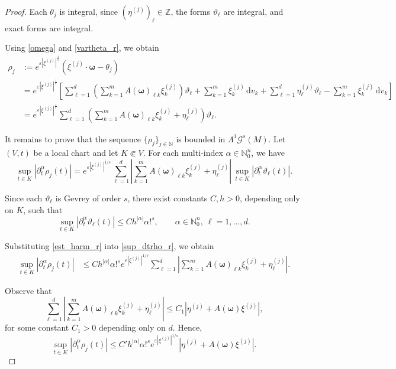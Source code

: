 \documentclass[11pt,reqno]{amsart}
\numberwithin{equation}{section}
\begin{document}
\begin{proof}
	Each $\theta_j$ is integral, since $(\eta^{(j)})_\ell\in\mathbb{Z}$, 
	the forms $\vartheta_\ell$ are integral, and exact forms are integral.
	
	Using \eqref{omega} and \eqref{vartheta_r}, we obtain
	\begin{align*}
		\rho_j & := e^{\varepsilon|\xi^{(j)}|^{\frac{1}{s}}}(\xi^{(j)} \cdot \boldsymbol{\omega} - \theta_j)\\
		& = e^{\varepsilon|\xi^{(j)}|^{\frac{1}{s}}}\left[\sum_{\ell=1}^{d}\left(\sum_{k=1}^{m}A(\boldsymbol{\omega})_{\ell k}\xi^{(j)}_k\right)\vartheta_\ell + \sum_{k=1}^{m}\xi^{(j)}_k\,\mathrm{d}v_k + \sum_{\ell=1}^{d}\eta^{(j)}_\ell\vartheta_\ell - \sum_{k=1}^{m}\xi^{(j)}_k\,\mathrm{d}v_k\right]\\
		& = e^{\varepsilon|\xi^{(j)}|^{\frac{1}{s}}} \sum_{\ell=1}^{d} \left(\sum_{k=1}^{m} A(\boldsymbol{\omega})_{\ell k}\xi^{(j)}_k + \eta^{(j)}_\ell\right)\vartheta_\ell.
	\end{align*}
	
	
	It remains to prove that the sequence $\{\rho_j\}_{j\in\mathbb{N}}$ is bounded in 	$\mathsf{\Lambda}^1 \mathscr{G}^s(M)$. Let $(V,t)$ be a local chart and let $K\Subset V$.  For each multi-index $\alpha\in\mathbb{N}_0^n$, we have 
	\begin{equation}\label{sup_dtrho_r}
		\sup_{t\in K} |\partial_t^\alpha \rho_j(t)| 
		= e^{\varepsilon|\xi^{(j)}|^{1/s}} \sum_{\ell=1}^d 	\left| \sum_{k=1}^m
		A(\boldsymbol{\omega})_{\ell k}\xi^{(j)}_k + \eta^{(j)}_\ell \right|
		\, 	\sup_{t\in K} |\partial_t^\alpha \vartheta_\ell(t)|.
	\end{equation}
	
	Since each $\vartheta_\ell$ is Gevrey of order $s$, 
	there exist constants $C,h>0$, depending only on $K$, such that
	\begin{equation}\label{est_harm_r}
		\sup_{t\in K}	|\partial_t^\alpha \vartheta_\ell(t)|
		\le C h^{|\alpha|}\alpha!^s, \qquad \alpha\in\mathbb{N}_0^n,\ \ell=1,\dots,d.
	\end{equation}
	
	Substituting \eqref{est_harm_r} into \eqref{sup_dtrho_r}, we obtain
	\begin{align*}
		\sup_{t\in K} |\partial_t^\alpha \rho_j(t)|
		&\le C h^{|\alpha|}\alpha!^s e^{\varepsilon|\xi^{(j)}|^{1/s}} \sum_{\ell=1}^d
		\left| \sum_{k=1}^m A(\boldsymbol{\omega})_{\ell k}\xi^{(j)}_k + \eta^{(j)}_\ell 	\right|.
	\end{align*}
	
	Observe that
	\[
	\sum_{\ell=1}^d \left| \sum_{k=1}^m A(\boldsymbol{\omega})_{\ell k}\xi^{(j)}_k +
	\eta^{(j)}_\ell \right|
	\le C_1 |\eta^{(j)} + A(\boldsymbol{\omega})\xi^{(j)}|, 
	\]
	for some constant $C_1>0$ depending only on $d$.  Hence,
	\[
	\sup_{t\in K} |\partial_t^\alpha \rho_j(t)| \le C' h^{|\alpha|}\alpha!^s 
	e^{\varepsilon|\xi^{(j)}|^{1/s}} |\eta^{(j)} + A(\boldsymbol{\omega})\xi^{(j)}|.
	\]
	

\end{proof}
\end{document}
